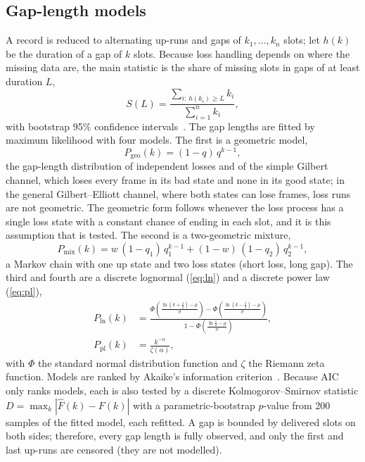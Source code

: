 \subsection{Gap-length models}
\label{sec:data-outages}
A record is reduced to alternating up-runs and gaps of $k_1,\dots,k_n$ slots; let $h(k)$ be the duration of a gap of $k$ slots. Because loss handling depends on where the missing data are, the main statistic is the share of missing slots in gaps of at least duration $L$,
\begin{equation}
S(L)=\frac{\sum_{i:\,h(k_i)\ge L} k_i}{\sum_{i=1}^{n} k_i},
\label{eq:share}
\end{equation}
with bootstrap 95\% confidence intervals~\cite{efron1979bootstrap}. The gap lengths are fitted by maximum likelihood with four models. The first is a geometric model,
\begin{equation}
P_\mathrm{geo}(k)=(1-q)\,q^{k-1},
\label{eq:geo}
\end{equation}
the gap-length distribution of independent losses and of the simple Gilbert channel, which loses every frame in its bad state and none in its good state; in the general Gilbert--Elliott channel, where both states can lose frames, loss runs are not geometric. The geometric form follows whenever the loss process has a single loss state with a constant chance of ending in each slot, and it is this assumption that is tested. The second is a two-geometric mixture,
\begin{equation}
P_\mathrm{mix}(k)=w\,(1-q_1)\,q_1^{k-1}+(1-w)\,(1-q_2)\,q_2^{k-1},
\label{eq:mix}
\end{equation}
a Markov chain with one up state and two loss states (short loss, long gap). The third and fourth are a discrete lognormal (\ref{eq:ln}) and a discrete power law (\ref{eq:pl}),
\begin{align}
P_\mathrm{ln}(k)&=\frac{\Phi\!\left(\frac{\ln(k+\frac12)-\mu}{\sigma}\right)-\Phi\!\left(\frac{\ln(k-\frac12)-\mu}{\sigma}\right)}{1-\Phi\!\left(\frac{\ln\frac12-\mu}{\sigma}\right)}, \label{eq:ln}\\
P_\mathrm{pl}(k)&=\frac{k^{-\alpha}}{\zeta(\alpha)}, \label{eq:pl}
\end{align}
with $\Phi$ the standard normal distribution function and $\zeta$ the Riemann zeta function. Models are ranked by Akaike's information criterion~\cite{akaike1974aic}. Because AIC only ranks models, each is also tested by a discrete Kolmogorov--Smirnov statistic $D=\max_k|\hat F(k)-F(k)|$ with a parametric-bootstrap $p$-value from 200 samples of the fitted model, each refitted. A gap is bounded by delivered slots on both sides; therefore, every gap length is fully observed, and only the first and last up-runs are censored (they are not modelled).

